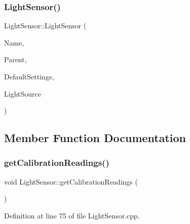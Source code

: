 \subsubsection{\texorpdfstring{Light\+Sensor()}{LightSensor()}\hspace{0.1cm}{\footnotesize\ttfamily [2/2]}}
{\footnotesize\ttfamily Light\+Sensor\+::\+Light\+Sensor (\begin{DoxyParamCaption}\item[{const \+\_\+\+\_\+\+Flash\+String\+Helper $\ast$}]{Name,  }\item[{\hyperlink{class_module}{Module} $\ast$}]{Parent,  }\item[{\hyperlink{struct_settings_1_1_light_sensor_settings}{Settings\+::\+Light\+Sensor\+Settings} $\ast$}]{Default\+Settings,  }\item[{\hyperlink{class_lights}{Lights} $\ast$}]{Light\+Source }\end{DoxyParamCaption})}



\subsection{Member Function Documentation}
\mbox{\label{class_light_sensor_a73dea4504d64c13c43a5c68bee9aef27}} 
\subsubsection{\texorpdfstring{get\+Calibration\+Readings()}{getCalibrationReadings()}\hspace{0.1cm}{\footnotesize\ttfamily [1/2]}}
{\footnotesize\ttfamily void Light\+Sensor\+::get\+Calibration\+Readings (\begin{DoxyParamCaption}{ }\end{DoxyParamCaption})}



Definition at line 75 of file Light\+Sensor.\+cpp.

